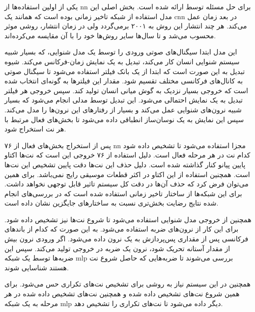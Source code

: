 یکی از اولین استفاده‌ها از \gls{nn} برای حل مسئله توسط
\cite{marolt2004connectionist} ارائه شده است. بخش اصلی این مدل استفاده از شبکه
تاخیر زمانی بوده است که همانند یک \gls{cnn} در بعد زمان عمل می‌کند. هر چند
انتشار این روش به ۲۰۰۱ برمی‌گردد ولی در زمان انتشار، روشی موثر محسوب می‌شد و تا
سال‌ها سایر روش‌ها خود را با آن مقایسه می‌کرده‌اند.

این مدل ابتدا سیگنال‌های صوتی ورودی را توسط یک مدل شنوایی، که بسیار شبیه سیستم
شنوایی انسان کار می‌کند، تبدیل به یک نمایش زمان-فرکانس می‌کند. شیوه تبدیل به این
صورت است که ابتدا از یک بانک فیلتر استفاده می‌شود تا سیگنال صوتی به کانال‌های
فرکانسی مختلف تقسیم شود. مقدار این فیلترها به گونه‌ای انتخاب شده است که خروجی
بسیار نزدیک به گوش میانی انسان تولید کند. سپس خروجی هر فیلتر تبدیل به یک نمایش
احتمالی می‌شود. این تبدیل توسط مدلی انجام می‌شود که بسیار شبیه نرون‌های شنوایی
عمل می‌کند و بسیار از رفتارهای این نرون‌ها را مدل می‌کند. سپس این نمایش به یک
نوسان‌ساز انطباقی داده می‌شود تا بخش‌های فعال مرتبط با هر نت استخراج شود.

پس از استخراج بخش‌های فعال از ۷۶ \gls{nn} مجزا استفاده می‌شود تا تشخیص داده شود
کدام نت در هر مرحله فعال است. دلیل استفاده از ۷۶ خروجی این است که نت‌ها اکتاو
پایین پیانو کنار گذاشته شده است. دلیل حذف این نت‌ها دقت پایین تشخیص  این نت‌ها
است. همچنین استفاده از این اکتاو در اکثر قطعات موسیقی رایج نمی‌باشد. برای همین
می‌توان فرض کرد که حذف آن‌ها در دقت کل سیستم تاثیر قابل توجهی نخواهد داشت. برای
این شبکه‌ها از ساختار تاخیر زمانی استفاده شده است که در بررسی‌های انجام شده
نتایج رضایت بخش‌تری نسبت به ساختارهای جایگزین نشان داده است.

همچنین از خروجی مدل شنوایی استفاده می‌شود تا شروع نت‌ها نیز تشخیص داده شود. برای
این کار از نرون‌های ضربه استفاده می‌شود. به این صورت که کدام از باندهای فرکانسی
پس از مقداری پس‌پردازش به یک نرون داده می‌شود. اگر ورودی نرون بیش از مقدار
آستانه تحریک شود، نرون یک ضربه در خروجی تولید می‌کند. سپس این ضربه‌ها توسط یک
شبکه \gls{mlp} بررسی می‌شوند تا ضربه‌هایی که حاصل شروع نت هستند شناسایی شوند.

همچنین در این سیستم نیاز به روشی برای تشخیص نت‌های تکراری حس می‌شود. برای همین
شروع نت‌های تشخیص داده شده و همچنین نت‌های تشخیص داده شده در هر مرحله به یک شبکه
\gls{mlp} دیگر داده می‌شود تا نت‌های تکراری را تشخیص دهد.

